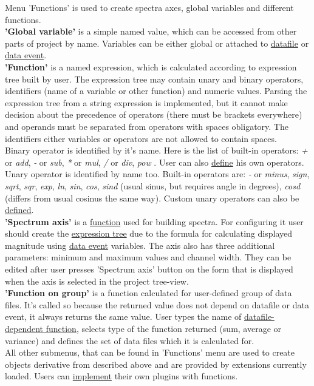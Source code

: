 \documentclass[a4paper]{article}
\begin{document}
{
Menu 'Functions' is used to create spectra axes, global variables and different functions.
\hypertarget{variable}{\\}
\textbf{'Global variable'} is a simple named value, which can be accessed from other parts of project by name.
Variables can be either global or attached to \hyperlink{datafile}{datafile} or \hyperlink{datafile}{data event}.
\hypertarget{function}{\\}
\textbf{'Function'} is a named expression, which is calculated according to expression tree built by user.
The expression tree may contain unary and binary operators, identifiers (name of a variable or other function) and numeric values.
Parsing the expression tree from a string expression is implemented, but it cannot make decision about the precedence of operators (there must be brackets everywhere) and operands must be separated from operators with spaces obligatory.
The identifiers either variables or operators are not allowed to contain spaces.
\\
Binary operator is identified by it's name.
Here is the list of built-in operators: 
\textit{+} or \textit{add}, 
\textit{-} or \textit{sub}, 
\textit{*} or \textit{mul}, 
\textit{/} or \textit{div},
\textit{pow}
.
User can also \hyperlink{userbinary}{define} his own operators. 
%
Unary operator is identified by name too.
Built-in operators are: 
\textit{-} or \textit{minus}, 
\textit{sign}, 
\textit{sqrt}, 
\textit{sqr}, 
\textit{exp}, 
\textit{ln}, 
\textit{sin}, 
\textit{cos}, 
\textit{sind} (usual sinus, but requires angle in degrees), 
\textit{cosd} (differs from usual cosinus the same way). 
Custom unary operators can also be \hyperlink{userbinary}{defined}. 
%
\hypertarget{axis}{\\}
\textbf{'Spectrum axis'} is a \hyperlink{function}{function} used for building spectra. 
For configuring it user should create the \hyperlink{function}{expression tree} due to the formula for calculating displayed magnitude using \hyperlink{datafile}{data event} variables.
The axis also has three additional parameters: minimum and maximum values and channel width. 
They can be edited after user presses 'Spectrum axis' button on the form that is displayed when the axis is selected in the project tree-view.
\hypertarget{functiondf}{\\}
\textbf{'Function on group'} is a function calculated for user-defined group of data files.
It's called so because the returned value does not depend on datafile or data event, it always returns the same value.
User types the name of \hyperlink{function}{datafile-dependent function}, selects type of the function returned (sum, average or variance) and defines the set of data files which it is calculated for. 
\\
All other submenus, that can be found in 'Functions' menu are used to create objects derivative from described above and are provided by extensions currently loaded. Users can \hyperlink{devtool}{implement} their own plugins with functions.
}
\end{document}
